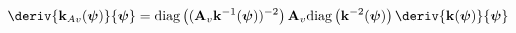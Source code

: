 \begin{equation}
\label{eq:mass-matrix-kav-deriv}
\deriv{\mathbf{k}_{Av}(\boldsymbol{\psi})}{\boldsymbol{\psi}}
=
\text{diag}\left(
    (\mathbf{A}_v \mathbf{k}^{-1}(\boldsymbol{\psi}))^{-2} \right)
\mathbf{A}_v
\text{diag} \left(
    \mathbf{k}^{-2}(\boldsymbol{\psi}) \right)
\deriv{\mathbf{k}(\boldsymbol{\psi})}{\boldsymbol{\psi}}
\end{equation}

